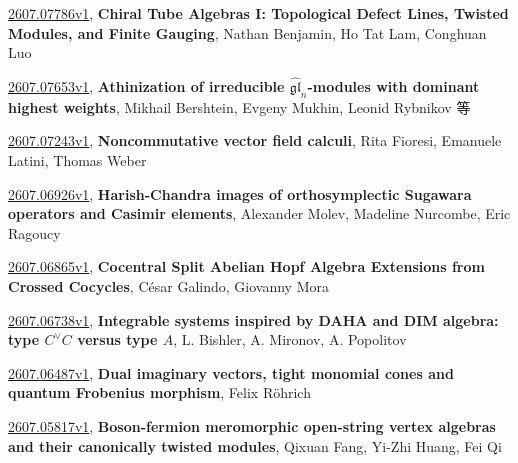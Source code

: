 \documentclass[9pt, a4paper]{article}
\theoremstyle{plain}
\theoremstyle{definition}
\theoremstyle{remark}
\newcommand{\arxiv}[3]{\href{https://arxiv.org/abs/#1}{#1}, \textbf{\textcolor{arxivblue}{#2}}, #3}
\begin{document}
\arxiv{2607.07786v1}{Chiral Tube Algebras I: Topological Defect Lines, Twisted Modules, and Finite Gauging}{Nathan Benjamin, Ho Tat Lam, Conghuan Luo}

\arxiv{2607.07653v1}{Athinization of irreducible $\widehat{\mathfrak{gl}}_n$-modules with dominant highest weights}{Mikhail Bershtein, Evgeny Mukhin, Leonid Rybnikov 等}

\arxiv{2607.07243v1}{Noncommutative vector field calculi}{Rita Fioresi, Emanuele Latini, Thomas Weber}

\arxiv{2607.06926v1}{Harish-Chandra images of orthosymplectic Sugawara operators and Casimir elements}{Alexander Molev, Madeline Nurcombe, Eric Ragoucy}

\arxiv{2607.06865v1}{Cocentral Split Abelian Hopf Algebra Extensions from Crossed Cocycles}{César Galindo, Giovanny Mora}

\arxiv{2607.06738v1}{Integrable systems inspired by DAHA and DIM algebra: type $C^\vee C$ versus type $A$}{L. Bishler, A. Mironov, A. Popolitov}

\arxiv{2607.06487v1}{Dual imaginary vectors, tight monomial cones and quantum Frobenius morphism}{Felix Röhrich}

\arxiv{2607.05817v1}{Boson-fermion meromorphic open-string vertex algebras and their canonically twisted modules}{Qixuan Fang, Yi-Zhi Huang, Fei Qi}

\end{document}
